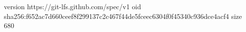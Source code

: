 version https://git-lfs.github.com/spec/v1
oid sha256:f652ac7d660ceef8f299137c2c467f44de5fceec6304f0f45340c936dce4acf4
size 680

